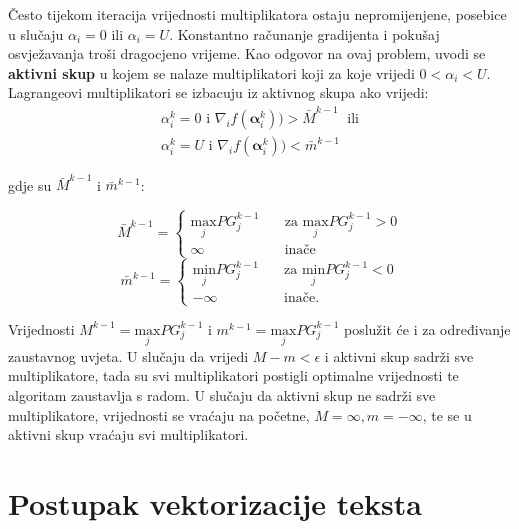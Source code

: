 \documentclass[times, utf8, zavrsni, numeric]{fer}
\newcommand{\iteralpha}{\boldsymbol{\alpha}_i^{k}}
\begin{document}
\par Često tijekom iteracija vrijednosti multiplikatora ostaju nepromijenjene, posebice u slučaju
$\alpha_i = 0$ ili $\alpha_i = U$. 
Konstantno računanje gradijenta i pokušaj osvježavanja troši dragocjeno vrijeme.
Kao odgovor na ovaj problem, uvodi se \textbf{aktivni skup} u kojem se nalaze multiplikatori koji
za koje vrijedi $0 < \alpha_i < U$. 
Lagrangeovi multiplikatori se izbacuju iz aktivnog skupa ako vrijedi:
\begin{equation}
\begin{split}
  \alpha_i^{k} = 0 \text{  i  } \nabla_if(\iteralpha)) > \bar{M}^{k - 1} \; \text{ ili} \\
  \alpha_i^{k} = U \text{  i  } \nabla_if(\iteralpha)) < \bar{m}^{k - 1}
\end{split}
\end{equation}

gdje su $\bar{M}^{k - 1}$ i $\bar{m}^{k - 1}$:

\begin{equation*}
  \bar{M}^{k - 1} = 
  \begin{cases}
    \underset{j}{\text{max}}PG_j^{k - 1} &  \quad \text{za } \underset{j}{\text{max}}PG_j^{k - 1} > 0\\
    \infty & \quad \text{inače}
  \end{cases}
\end{equation*}
\begin{equation*}
  \bar{m}^{k - 1} = 
  \begin{cases}
    \underset{j}{\text{min}}PG_j^{k - 1} &  \quad \text{za } \underset{j}{\text{min}}PG_j^{k - 1} < 0\\
    - \infty & \quad \text{inače}.
  \end{cases}
\end{equation*}

\par Vrijednosti $M^{k - 1} = \underset{j}{\text{max}}PG_j^{k - 1}$ i 
$m^{k - 1} = \underset{j}{\text{max}}PG_j^{k - 1}$ poslužit će i za određivanje zaustavnog uvjeta. 
U slučaju da vrijedi $M - m < \epsilon$ i aktivni skup sadrži sve multiplikatore, 
tada su svi multiplikatori postigli optimalne vrijednosti te algoritam zaustavlja s radom.
U slučaju da aktivni skup ne sadrži sve multiplikatore, vrijednosti se vraćaju na početne, 
$M = \infty, m = - \infty$, te se u aktivni skup vraćaju svi multiplikatori.

\section{Postupak vektorizacije teksta} \label{sec:vektorizacija}
\end{document}
